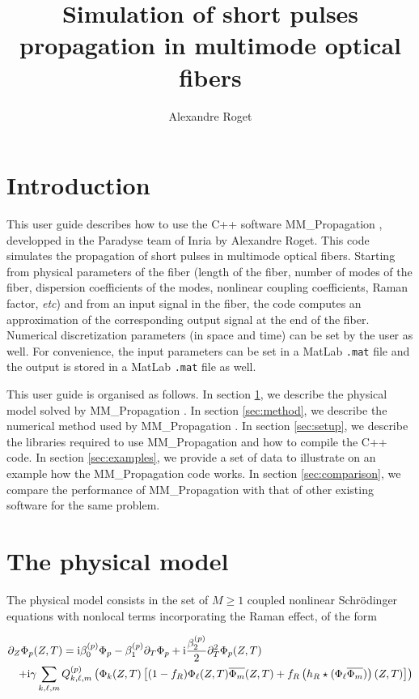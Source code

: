 \documentclass[11pt]{amsart}
\title[MM\_Propagation userguide]
{Simulation of short pulses propagation in multimode optical fibers}
\author[A. Roget]{Alexandre Roget}
\newcommand{\ii}{{\rm i}}
\newcommand{\name}{{\rm MM\_Propagation }}
\begin{document}
\setlength{\parindent}{0pt}


\maketitle

\section*{Introduction}
This user guide describes how to use the C++ software \name, developped in the Paradyse
team of Inria by Alexandre Roget.
This code simulates the propagation of short pulses in multimode optical fibers.
Starting from physical parameters of the fiber
(length of the fiber, number of modes of the fiber, dispersion coefficients of the modes,
nonlinear coupling coefficients, Raman factor, {\it etc})
and from an input signal in the fiber, the code computes an approximation of the corresponding
output signal at the end of the fiber.
Numerical discretization parameters (in space and time) can be set by the user as well.
For convenience, the input parameters can be set in a MatLab {\tt .mat} file and
the output is stored in a MatLab {\tt .mat} file as well.

This user guide is organised as follows.
In section \ref{sec:equations}, we describe the physical model solved by \name.
In section \ref{sec:method}, we describe the numerical method used by \name.
In section \ref{sec:setup}, we describe the libraries required to use \name and how to compile the C++ code.
In section \ref{sec:examples}, we provide a set of data to illustrate on an example
how the \name
code works.
In section \ref{sec:comparison}, we compare the performance of \name
with that of other existing software for the same problem.

\section{The physical model}
\label{sec:equations}

The physical model consists in the set of $M\geq 1$ coupled nonlinear Schr\"odinger
equations with nonlocal terms incorporating the Raman effect, of the form

\begin{eqnarray}
  \label{eq:original}
  \lefteqn{\partial_Z \Phi_{p}(Z,T) =
  \ii\beta_0^{(p)} \Phi_p
  -\beta_1^{(p)} \partial_T \Phi_p
  + \ii\frac{\beta_2^{(p)}}{2} \partial_T^2\Phi_p(Z,T)} \\
  & & +\ii\gamma\sum_{k,\ell,m} Q^{(p)}_{k,\ell,m}
  \left(\Phi_k (Z,T) \left[(1-f_R)\Phi_\ell (Z,T)\overline{\Phi_m}(Z,T)
  + f_R\left(h_R\star (\Phi_\ell\overline{\Phi_m})\right)(Z,T)\right]\right) \nonumber
\end{eqnarray}
\end{document}
